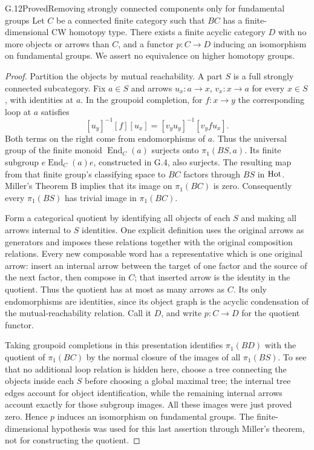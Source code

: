 \begin{claim}{G.12}{Proved}{Removing strongly connected components only for fundamental groups}
Let $C$ be a connected finite category such that $BC$ has a finite-dimensional CW homotopy type. There exists a finite acyclic category $D$ with no more objects or arrows than $C$, and a functor $p:C\to D$ inducing an isomorphism on fundamental groups. We assert no equivalence on higher homotopy groups.
\end{claim}
\begin{proof}
Partition the objects by mutual reachability. A part $S$ is a full strongly connected subcategory. Fix $a\in S$ and arrows $u_x:a\to x$, $v_x:x\to a$ for every $x\in S$, with identities at $a$. In the groupoid completion, for $f:x\to y$ the corresponding loop at $a$ satisfies
\[
 [u_y]^{-1}[f][u_x]=[v_yu_y]^{-1}[v_yfu_x].
\]
Both terms on the right come from endomorphisms of $a$. Thus the universal group of the finite monoid $\operatorname{End}_C(a)$ surjects onto $\pi_1(BS,a)$. Its finite subgroup $e\operatorname{End}_C(a)e$, constructed in G.4, also surjects. The resulting map from that finite group's classifying space to $BC$ factors through $BS$ in $\mathrm{Hot}$. Miller's Theorem B implies that its image on $\pi_1(BC)$ is zero. Consequently every $\pi_1(BS)$ has trivial image in $\pi_1(BC)$.

Form a categorical quotient by identifying all objects of each $S$ and making all arrows internal to $S$ identities. One explicit definition uses the original arrows as generators and imposes these relations together with the original composition relations. Every new composable word has a representative which is one original arrow: insert an internal arrow between the target of one factor and the source of the next factor, then compose in $C$; that inserted arrow is the identity in the quotient. Thus the quotient has at most as many arrows as $C$. Its only endomorphisms are identities, since its object graph is the acyclic condensation of the mutual-reachability relation. Call it $D$, and write $p:C\to D$ for the quotient functor.

Taking groupoid completions in this presentation identifies $\pi_1(BD)$ with the quotient of $\pi_1(BC)$ by the normal closure of the images of all $\pi_1(BS)$. To see that no additional loop relation is hidden here, choose a tree connecting the objects inside each $S$ before choosing a global maximal tree; the internal tree edges account for object identification, while the remaining internal arrows account exactly for those subgroup images. All these images were just proved zero. Hence $p$ induces an isomorphism on fundamental groups. The finite-dimensional hypothesis was used for this last assertion through Miller's theorem, not for constructing the quotient.
\end{proof}


